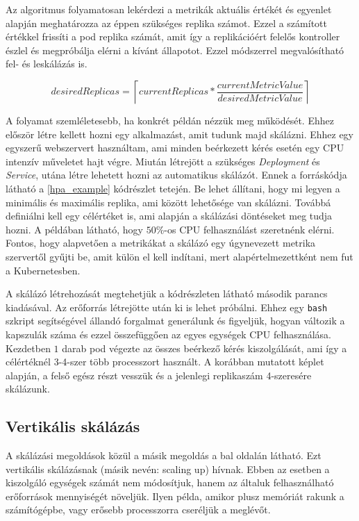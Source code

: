 Az algoritmus folyamatosan lekérdezi a metrikák aktuális értékét és  egyenlet alapján meghatározza az éppen szükséges replika számot. Ezzel a számított értékkel frissíti a pod replika számát, amit így a replikációért felelős kontroller észlel és megpróbálja elérni a kívánt állapotot. Ezzel módszerrel megvalósítható fel- és leskálázás is.

\begin{equation}
\label{hpa_algo}
desiredReplicas = \left\lceil currentReplicas * \frac{currentMetricValue}{desiredMetricValue} \right\rceil
\end{equation}

A folyamat szemléletesebb, ha konkrét példán nézzük meg működését.
Ehhez először létre kellett hozni egy alkalmazást, amit tudunk majd skálázni.
Ehhez egy egyszerű webszervert használtam, ami minden beérkezett kérés esetén egy CPU intenzív műveletet hajt végre. 
Miután létrejött a szükséges \textit{Deployment} és \textit{Service}, utána létre lehetett hozni az automatikus skálázót.
Ennek a forráskódja látható a \ref{hpa_example} kódrészlet tetején.
Be lehet állítani, hogy mi legyen a minimális és maximális replika, ami között lehetősége van skálázni. 
Továbbá definiálni kell egy célértéket is, ami alapján a skálázási döntéseket meg tudja hozni.
A példában látható, hogy $50\%$-os CPU felhasználást szeretnénk elérni.
Fontos, hogy alapvetően a metrikákat a skálázó egy úgynevezett metrika szervertől gyűjti be, amit külön el kell indítani, mert alapértelmezettként nem fut a Kubernetesben. \\

\lstset{caption=Automatikus horizontális skálázás folyamata, label=hpa_example}


A skálázó létrehozását megtehetjük a kódrészleten látható második parancs kiadásával.
Az erőforrás létrejötte után ki is lehet próbálni.
Ehhez egy \verb+bash+ szkript segítségével állandó forgalmat generálunk és figyeljük, hogyan változik a kapszulák száma és ezzel összefüggően az egyes egységek CPU felhasználása.
Kezdetben $1$ darab pod végezte az összes beérkező kérés kiszolgálását, ami így a célértéknél 3-4-szer több processzort használt.
A korábban mutatott képlet alapján, a felső egész részt vesszük és a jelenlegi replikaszám 4-szeresére skálázunk.


\subsection{Vertikális skálázás}
A skálázási megoldások közül a másik megoldás a  bal oldalán látható. 
Ezt vertikális skálázásnak (másik nevén: scaling up) hívnak. 
Ebben az esetben a kiszolgáló egységek számát nem módosítjuk, hanem az általuk felhasználható erőforrások mennyiségét növeljük.
Ilyen példa, amikor plusz memóriát rakunk a számítógépbe, vagy erősebb processzorra cseréljük a meglévőt. 

